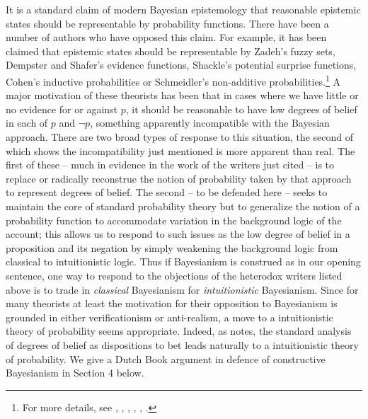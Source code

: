It is a standard claim of modern Bayesian epistemology that reasonable epistemic states should be representable by probability functions. There have been a number of authors who have opposed this claim. For example, it has been claimed that epistemic states should be representable by Zadeh's fuzzy sets, Dempster and Shafer's evidence functions, Shackle's potential surprise functions, Cohen's inductive probabilities or Schmeidler's non-additive probabilities.\footnote{ For more details, see \citet{Zadeh1978}, \citet{Dempster1967}, \citet{Shafer1976}, \citet{Shackle1949}, \citet{Cohen1977}, \citet{Schmeidler1989}.} A major motivation of these theorists has been that in cases where we have little or no evidence for or against \(p\), it should be reasonable to have low degrees of belief in each of \(p\) and ${\lnot}$\(p\), something apparently incompatible with the Bayesian approach. There are two broad types of response to this situation, the second of which shows the incompatibility just mentioned is more apparent than real. The first of these -- much in evidence in the work of the writers just cited -- is to replace or radically reconstrue the notion of probability taken by that approach to represent degrees of belief. The second -- to be defended here -- seeks to maintain the core of standard probability theory but to generalize the notion of a probability function to accommodate variation in the background logic of the account; this allows us to respond to such issues as the low degree of belief in a proposition and its negation by simply weakening the background logic from classical to intuitionistic logic. Thus if Bayesianism is construed as in our opening sentence, one way to respond to the objections of the heterodox writers listed above is to trade in \textit{classical} Bayesianism for \textit{intuitionistic} Bayesianism. Since for many theorists at least the motivation for their opposition to Bayesianism is grounded in either verificationism or anti-realism, a move to a intuitionistic theory of probability seems appropriate. Indeed, as \citet{Harman1983} notes, the standard analysis of degrees of belief as dispositions to bet leads naturally to a intuitionistic theory of probability. We give a Dutch Book argument in defence of constructive Bayesianism in Section 4 below.


